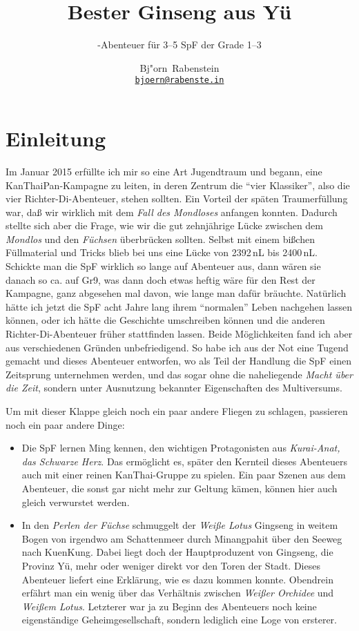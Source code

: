 \documentclass[
a4paper,
twoside,
DIV=calc,
BCOR=4mm,
fontsize=9pt,
twocolumn=on,
titlepage=on,
parskip=half
]{scrartcl}
\author{Bj"orn~Rabenstein\\\href{mailto:bjoern@rabenste.in}{\nolinkurl{bjoern@rabenste.in}}}
\title{Bester Ginseng aus Yü}
\subtitle{\midgard-Abenteuer für 3--5 SpF der Grade 1--3}
\begin{document}
\maketitle

\tableofcontents

\section{Einleitung}

Im Januar 2015 erfüllte ich mir so eine Art Jugendtraum und begann,
eine KanThaiPan-Kampagne zu leiten, in deren Zentrum die "`vier
Klassiker"', also die vier Richter-Di-Abenteuer, stehen sollten. Ein
Vorteil der späten Traumerfüllung war, daß wir wirklich mit dem
\emph{Fall des Mondloses} anfangen konnten. Dadurch stellte sich aber
die Frage, wie wir die gut zehnjährige Lücke zwischen dem
\emph{Mondlos} und den \emph{Füchsen} überbrücken sollten. Selbst mit
einem bißchen Füllmaterial und Tricks blieb bei uns eine Lücke von
2392\,nL bis 2400\,nL. Schickte man die SpF wirklich so lange auf
Abenteuer aus, dann wären sie danach so ca. auf Gr9, was dann doch
etwas heftig wäre für den Rest der Kampagne, ganz abgesehen mal davon,
wie lange man dafür bräuchte. Natürlich hätte ich jetzt die SpF acht
Jahre lang ihrem "`normalen"' Leben nachgehen lassen können, oder ich
hätte die Geschichte umschreiben können und die anderen
Richter-Di-Abenteuer früher stattfinden lassen. Beide Möglichkeiten
fand ich aber aus verschiedenen Gründen unbefriedigend. So habe ich
aus der Not eine Tugend gemacht und dieses Abenteuer entworfen, wo als
Teil der Handlung die SpF einen Zeitsprung unternehmen werden, und das
sogar ohne die naheliegende \emph{Macht über die Zeit}, sondern unter
Ausnutzung bekannter Eigenschaften des Multiversums.

Um mit dieser Klappe gleich noch ein paar andere Fliegen zu schlagen,
passieren noch ein paar andere Dinge:

\begin{itemize}
\item Die SpF lernen Ming kennen, den wichtigen Protagonisten aus
  \emph{Kurai-Anat, das Schwarze Herz}. Das ermöglicht es, später den
  Kernteil dieses Abenteuers auch mit einer reinen KanThai-Gruppe zu
  spielen. Ein paar Szenen aus dem Abenteuer, die sonst gar nicht mehr
  zur Geltung kämen, können hier auch gleich verwurstet werden.
\item In den \emph{Perlen der Füchse} schmuggelt der \emph{Weiße
    Lotus} Gingseng in weitem Bogen von irgendwo am Schattenmeer durch
  Minangpahit über den Seeweg nach KuenKung. Dabei liegt doch der
  Hauptproduzent von Gingseng, die Provinz Yü, mehr oder weniger
  direkt vor den Toren der Stadt. Dieses Abenteuer liefert eine
  Erklärung, wie es dazu kommen konnte. Obendrein erfährt man ein
  wenig über das Verhältnis zwischen \emph{Weißer Orchidee} und
  \emph{Weißem Lotus}. Letzterer war ja zu Beginn des Abenteuers noch
  keine eigenständige Geheimgesellschaft, sondern lediglich eine Loge
  von ersterer.
\end{itemize}
\end{document}
